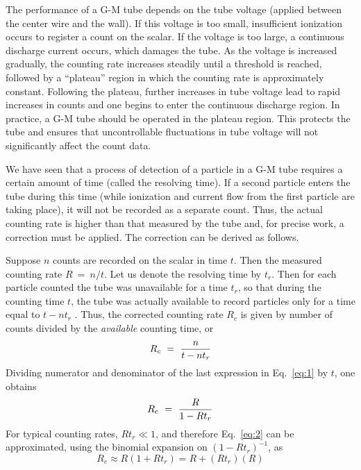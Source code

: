 \documentclass{article}
\begin{document}
The performance of a G-M tube depends on the tube voltage (applied
between the center wire and the wall).  If this voltage is too small,
insufficient ionization occurs to register a count on the scalar.  If
the voltage is too large, a continuous discharge current occurs, which
damages the tube.  As the voltage is increased gradually, the counting
rate increases steadily until a threshold is reached, followed by a
``plateau'' region in which the counting rate
is approximately constant.  Following the
plateau, further increases in tube voltage lead to rapid increases in
counts and one begins to enter the continuous discharge region.  In
practice, a G-M tube should be operated in the plateau region.  This
protects the tube and ensures that uncontrollable fluctuations in tube
voltage will not significantly affect the count data.


We have seen that a process of detection of a particle in a G-M tube
requires a certain amount of time (called the resolving time). If a
second particle enters the tube during this time (while ionization and
current flow from the first particle are taking place), it will not be
recorded as a separate count.  Thus, the actual counting rate is
higher than that measured by the tube and, for precise work, a
correction must be applied.  The correction can be derived as follows.

Suppose $n$ counts are recorded on the scalar in time $t$.  Then the
measured counting rate $R~=~n/t$.  Let us denote the resolving time by
$t_r$.  Then for each particle counted the tube
was unavailable for a time $t_r$, so that during the
counting time $t$, the tube was actually available to record particles
only for a time equal to $t - n t_r$ . Thus, the corrected
counting rate $R_{c}$ is given by number of counts divided by the {\em available} counting time, or
\begin{equation}
R_c ~=~ { n \over t - n t_r }
\label{eq:1}
\end{equation}
Dividing numerator and denominator of the last expression in Eq.~\ref{eq:1} by
$t$, one obtains
\begin{equation}
R_c ~=~ { R \over 1 - R t_r }
\label{eq:2}
\end{equation}
For typical counting rates, $R t_{r} \ll 1$, and therefore Eq.~\ref{eq:2} can be approximated,
using the binomial expansion on $(1-R t_r)^{-1}$, as
\begin{equation}
R_{c} \approx R(1 + Rt_{r}) = R + (Rt_{r})(R)
\label{eq:3}
\end{equation}
\end{document}
